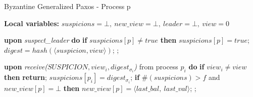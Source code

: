 \begin{algorithm}
	\caption{Byzantine Generalized Paxos - Process p}
	\textbf{Local variables:} $suspicions = \bot,\ new\_view = \bot,\ leader = \bot,\ view = 0$
	\begin{algorithmic}[1]
		
		\State \textbf{upon} \textit{suspect\_leader} \textbf{do} 
		\State \hspace{\algorithmicindent} \textbf{if} $suspicions[p] \neq true$ \textbf{then}
		\State\hspace{\algorithmicindent}\hspace{\algorithmicindent}$suspicions[p] = true$;
		\State\hspace{\algorithmicindent}\hspace{\algorithmicindent}$ digest = hash(\langle suspicion, view \rangle) $;
		\State\hspace{\algorithmicindent}\hspace{\algorithmicindent};	
		\State
		
		\State \textbf{upon} \textit{receive($SUSPICION, view_i, digest_{\sigma_i}$)} from process $p_i$ \textbf{do} 
		\State \hspace{\algorithmicindent} \textbf{if} $view_i \neq view$ \textbf{then}
		\State \hspace{\algorithmicindent}\hspace{\algorithmicindent} \textbf{return};
		\State
		\State \hspace{\algorithmicindent} $suspicions[p_i] = digest_{\sigma_i}$;
		\State \hspace{\algorithmicindent} \textbf{if} $\#(suspicions) > f$ and $new\_view[p] = \bot$ \textbf{then}
		\State\hspace{\algorithmicindent}\hspace{\algorithmicindent} $new\_view[p] = \langle last\_bal,\ last\_val \rangle$;
		\State\hspace{\algorithmicindent}\hspace{\algorithmicindent}  ;
		\State
		

\end{algorithmic}
\end{algorithm}
